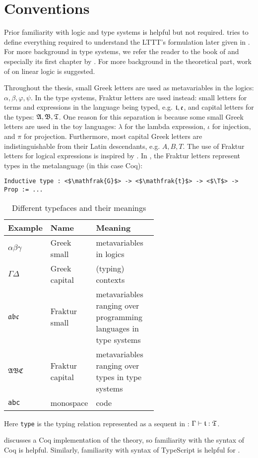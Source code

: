 \section{Conventions}

Prior familiarity with logic and type systems is helpful but not required.  tries to define everything required to understand the LTTT's formulation later given in . For more background in type systems, we refer the reader to the book of \cite{10.5555/1076265} and especially its first chapter by \cite{DavidWalker2004}. For more background in the theoretical part, work of \cite{DBLP:journals/tcs/Girard87} on linear logic is suggested.

Throughout the thesis, small Greek letters are used as metavariables in the logics: $\alpha, \beta, \varphi, \psi$. In the type systems, Fraktur letters are used instead: small letters for terms and expressions in the language being typed, e.g. $\mathfrak{t}, \mathfrak{e}$, and capital letters for the types: $\mathfrak{A}, \mathfrak{B}, \mathfrak{T}$. One reason for this separation is because some small Greek letters are used in the toy languages: $\lambda$ for the lambda expression, $\iota$ for injection, and $\pi$ for projection. Furthermore, most capital Greek letters are indistinguishable from their Latin descendants, e.g. $A, B, T$. The use of Fraktur letters for logical expressions is inspired by \cite{hilbert1928}.
In , the Fraktur letters represent types in the metalanguage (in this case Coq):

\begin{verbatim}
Inductive type : <$\mathfrak{G}$> -> <$\mathfrak{t}$> -> <$\T$> -> Prop := ...
\end{verbatim}

\begin{table}[t]
    \centering
    \begin{tabular}{l|l|p{0.6\linewidth}}
        Example & Name & Meaning  \\
        \hline
        $\alpha\beta\gamma$ & Greek small & metavariables in logics \\
        $\Gamma\Delta$ & Greek capital & (typing) contexts \\
        $\mathfrak{a}\mathfrak{b}\mathfrak{c}$ & Fraktur small & metavariables ranging over programming languages in type systems \\
        $\mathfrak{A}\mathfrak{B}\mathfrak{C}$ & Fraktur capital & metavariables ranging over types in type systems \\
        \texttt{abc} & monospace & code
    \end{tabular}
    \caption{Different typefaces and their meanings}
    \label{tab:fonts}
\end{table}

Here \texttt{type} is the typing relation represented as a sequent in : $\Gamma \vdash \mathfrak{t} : \mathfrak{T}$.

 discusses a Coq implementation of the theory, so familiarity with the syntax of Coq is helpful. Similarly, familiarity with syntax of TypeScript is helpful for .